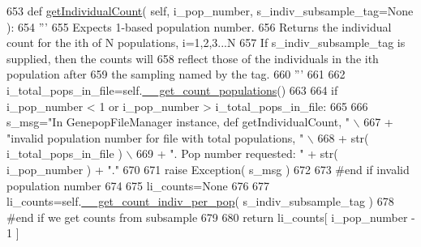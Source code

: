 \begin{DoxyCode}
653     \textcolor{keyword}{def }\hyperlink{classnegui_1_1genepopfilemanager_1_1GenepopFileManager_a05e723069f5129b21a4d017c2a5317b0}{getIndividualCount}( self, i\_pop\_number, s\_indiv\_subsample\_tag=None ):
654         \textcolor{stringliteral}{'''}
655 \textcolor{stringliteral}{        Expects 1-based population number.}
656 \textcolor{stringliteral}{        Returns the individual count for the ith of N populations, i=1,2,3...N}
657 \textcolor{stringliteral}{        If s\_indiv\_subsample\_tag is supplied, then the counts will}
658 \textcolor{stringliteral}{        reflect those of the individuals in the ith population after}
659 \textcolor{stringliteral}{        the sampling named by the tag.}
660 \textcolor{stringliteral}{        '''}
661 
662         i\_total\_pops\_in\_file=self.\hyperlink{classnegui_1_1genepopfilemanager_1_1GenepopFileManager_a51f6dcbd17c80f8e61114b11283b655f}{\_\_get\_count\_populations}()  
663 
664         \textcolor{keywordflow}{if} i\_pop\_number < 1 \textcolor{keywordflow}{or} i\_pop\_number > i\_total\_pops\_in\_file:
665 
666             s\_msg=\textcolor{stringliteral}{"In GenepopFileManager instance, def getIndividualCount, "} \(\backslash\)
667                     + \textcolor{stringliteral}{"invalid population number for file with total populations, "} \(\backslash\)
668                     + str( i\_total\_pops\_in\_file ) \(\backslash\)
669                     + \textcolor{stringliteral}{".  Pop number requested: "} + str( i\_pop\_number ) + \textcolor{stringliteral}{"."}
670 
671             \textcolor{keywordflow}{raise} Exception( s\_msg )
672 
673         \textcolor{comment}{#end if  invalid population number}
674 
675         li\_counts=\textcolor{keywordtype}{None}
676 
677         li\_counts=self.\hyperlink{classnegui_1_1genepopfilemanager_1_1GenepopFileManager_a8efe11151549d7da2bc024f836491af4}{\_\_get\_count\_indiv\_per\_pop}( s\_indiv\_subsample\_tag )
678         \textcolor{comment}{#end if we get counts from subsample}
679 
680         \textcolor{keywordflow}{return} li\_counts[ i\_pop\_number - 1 ]
\end{DoxyCode}
